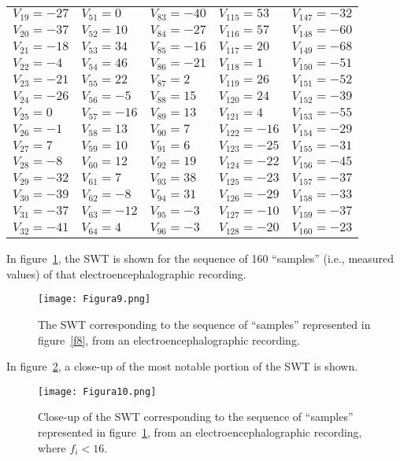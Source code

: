 \documentclass[11pt]{rMTA2010} \usepackage[utf8]{inputenc} \usepackage{graphicx} \usepackage{booktabs} \usepackage{array} \usepackage{enumerate}
\begin{document}
\begin{tabular}{ l l l l l }
$V_{19}=-27$ & $V_{51}=0$ & $V_{83}=-40$ & $V_{115}=53$ & $V_{147}=-32$ \\
$V_{20}=-37$ & $V_{52}=10$ & $V_{84}=-27$ & $V_{116}=57$ & $V_{148}=-60$ \\
$V_{21}=-18$ & $V_{53}=34$ & $V_{85}=-16$ & $V_{117}=20$ & $V_{149}=-68$ \\
$V_{22}=-4$ & $V_{54}=46$ & $V_{86}=-21$ & $V_{118}=1$ & $V_{150}=-51$ \\
$V_{23}=-21$ & $V_{55}=22$ & $V_{87}=2$ & $V_{119}=26$ & $V_{151}=-52$ \\
$V_{24}=-26$ & $V_{56}=-5$ & $V_{88}=15$ & $V_{120}=24$ & $V_{152}=-39$ \\
$V_{25}=0$ & $V_{57}=-16$ & $V_{89}=13$ & $V_{121}=4$ & $V_{153}=-55$ \\
$V_{26}=-1$ & $V_{58}=13$ & $V_{90}=7$ & $V_{122}=-16$ & $V_{154}=-29$ \\
$V_{27}=7$ & $V_{59}=10$ & $V_{91}=6$ & $V_{123}=-25$ & $V_{155}=-31$ \\
$V_{28}=-8$ & $V_{60}=12$ & $V_{92}=19$ & $V_{124}=-22$ & $V_{156}=-45$ \\
$V_{29}=-32$ & $V_{61}=7$ & $V_{93}=38$ & $V_{125}=-23$ & $V_{157}=-37$ \\
$V_{30}=-39$ & $V_{62}=-8$ & $V_{94}=31$ & $V_{126}=-29$ & $V_{158}=-33$ \\
$V_{31}=-37$ & $V_{63}=-12$ & $V_{95}=-3$ & $V_{127}=-10$ & $V_{159}=-37$ \\
$V_{32}=-41$ & $V_{64}=4$ & $V_{96}=-3$ & $V_{128}=-20$ & $V_{160}=-23$ \\
\end{tabular}

\vspace{8mm}


In figure~\ref{f9}, the SWT is shown for the sequence of 160 ``samples'' (i.e., measured values) of that electroencephalographic recording.

\begin{figure}[H]
\centering
\texttt{[image: Figura9.png]}
\caption{The SWT corresponding to the sequence of ``samples'' represented in figure~\ref{f8}, from an electroencephalographic recording.}
\label{f9}
\end{figure}

In figure~\ref{f11}, a close-up of the most notable portion of the SWT is shown.

\begin{figure}[H]
\centering
\texttt{[image: Figura10.png]}
\caption{Close-up of the SWT corresponding to the sequence of ``samples'' represented in figure~\ref{f9}, from an electroencephalographic recording, where $f_i<16$.}
\label{f11}
\end{figure}
\end{document}
